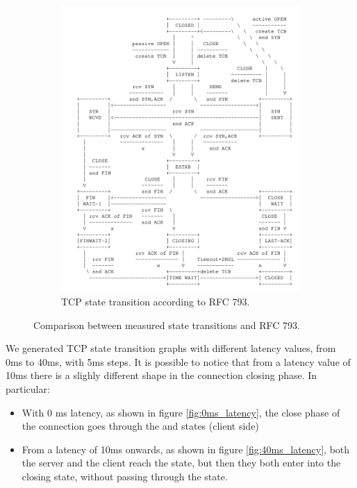 \documentclass[a4paper,10pt]{article}
\begin{document}
\begin{figure}[]
\begin{subfigure}{.30\textwidth}
   \includegraphics[width=\textwidth]{images/RFC_Graph.png}
    \caption{TCP state transition according to RFC 793.}
    \label{fig:RFC_graph}
\end{subfigure}
\caption[short]{Comparison between measured state transitions and RFC 793.}
\end{figure}

We generated TCP state transition graphs with different latency values, from 0ms to 40ms, with 5ms steps. It is possible to notice that from a latency value of 10ms there is a slighly different shape in the connection closing phase. In particular:
\begin{itemize}
   \item With 0 ms latency, as shown in figure \ref{fig:0ms_latency}, the close phase of the connection goes through the  and  states (client side)
   \item From a latency of 10ms onwards, as shown in figure \ref{fig:40ms_latency}, both the server and the client reach the  state, but then they both enter into the closing state, without passing through the  state.
\end{itemize}
\end{document}

